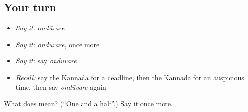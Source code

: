 \subsection*{Your turn}
\begin{itemize}
\raggedright
  \item \emph{Say it:} \emph{ondūvare}
  \item \emph{Say it:} \emph{ondūvare}, once more
  \item \emph{Say it:} say \emph{ondūvare}
  \item \emph{Recall:} say the Kannada for a deadline, then the Kannada for an auspicious time, then say \emph{ondūvare} again
\end{itemize}

\begin{tcolorbox}[breakable,colback=teal!4,colframe=teal!35!black,title={Before you move on}]
What does  mean? (\textquotedblleft{}One and a half\textquotedblright{}.) Say it once more.
\end{tcolorbox}
